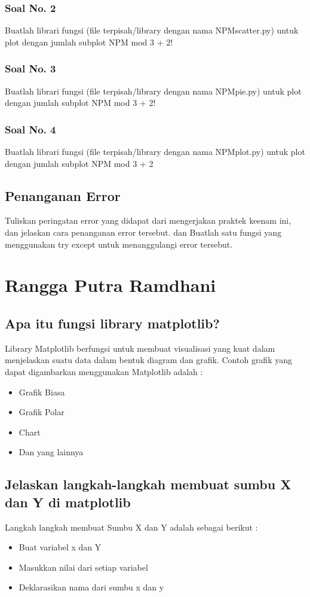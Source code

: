 \subsubsection{Soal No. 2}
\hfill \break
Buatlah librari fungsi (file terpisah/library dengan nama NPMscatter.py) untuk plot dengan jumlah subplot NPM mod 3 + 2!

\subsubsection{Soal No. 3}
\hfill \break
Buatlah librari fungsi (file terpisah/library dengan nama NPMpie.py) untuk plot dengan jumlah subplot NPM mod 3 + 2!

\subsubsection{Soal No. 4}
\hfill \break
Buatlah librari fungsi (file terpisah/library dengan nama NPMplot.py) untuk plot dengan jumlah subplot NPM mod 3 + 2


\subsection{Penanganan Error}
Tuliskan  peringatan  error  yang  didapat  dari  mengerjakan  praktek  keenam  ini, dan  jelaskan  cara  penanganan  error  tersebut. dan  Buatlah  satu  fungsi  yang menggunakan try except untuk menanggulangi error tersebut.

\section{Rangga Putra Ramdhani}
\subsection{Apa itu fungsi library matplotlib?}
Library Matplotlib berfungsi untuk membuat visualisasi yang kuat dalam menjelaskan suatu data dalam bentuk diagram dan grafik. 
Contoh grafik yang dapat digambarkan menggunakan Matplotlib adalah :
\begin{itemize}
    \item Grafik Biasa 
    \item Grafik Polar
    \item Chart
    \item Dan yang lainnya
\end{itemize}

\subsection{Jelaskan langkah-langkah membuat sumbu X dan Y di matplotlib}
Langkah langkah membuat Sumbu X dan Y adalah sebagai berikut :
\begin{itemize}
    \item Buat variabel x dan Y
    \item Masukkan nilai dari setiap variabel
    
    \item Deklarasikan nama dari sumbu x dan y 
    
\end{itemize}

